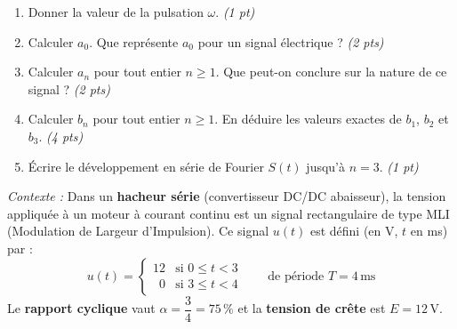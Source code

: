 \documentclass[a4paper,11pt]{article}
\begin{document}
\begin{enumerate}[label=\textbf{\arabic*.}]
  \item Donner la valeur de la pulsation $\omega$. \hfill \textit{(1 pt)}
  \begin{tcolorbox}[reponsebox, height=1.3cm]\end{tcolorbox}

  \item Calculer $a_0$. Que représente $a_0$ pour un signal électrique ? \hfill \textit{(2 pts)}
  \begin{tcolorbox}[reponsebox, height=2cm]\end{tcolorbox}
  
  \newpage

  \item Calculer $a_n$ pour tout entier $n \geq 1$. Que peut-on conclure sur la nature de ce signal ? \hfill \textit{(2 pts)}
  \begin{tcolorbox}[reponsebox, height=4cm]\end{tcolorbox}

  \item Calculer $b_n$ pour tout entier $n \geq 1$.
        En déduire les valeurs exactes de $b_1$, $b_2$ et $b_3$. \hfill \textit{(4 pts)}
  \begin{tcolorbox}[reponsebox, height=6cm]\end{tcolorbox}

  \item Écrire le développement en série de Fourier $S(t)$ jusqu'à $n = 3$. \hfill \textit{(1 pt)}
  \begin{tcolorbox}[reponsebox, height=2cm]\end{tcolorbox}
\end{enumerate}



\begin{tcolorbox}[exobox={Exercice 2 \hfill \normalfont\textit{(10 points)}}]
  \textit{Contexte :} Dans un \textbf{hacheur série} (convertisseur DC/DC abaisseur), la tension
  appliquée à un moteur à courant continu est un signal rectangulaire de type MLI (Modulation de
  Largeur d'Impulsion). Ce signal $u(t)$ est défini (en V, $t$ en ms) par :
  \[
    u(t) = \begin{cases} 12 & \text{si } 0 \leq t < 3 \\ \phantom{1}0 & \text{si } 3 \leq t < 4 \end{cases}
    \qquad \text{de période } T = 4\,\mathrm{ms}
  \]
  Le \textbf{rapport cyclique} vaut $\alpha = \dfrac{3}{4} = 75\,\%$ et la \textbf{tension de crête} est $E = 12\,\mathrm{V}$.
\end{tcolorbox}
\end{document}
